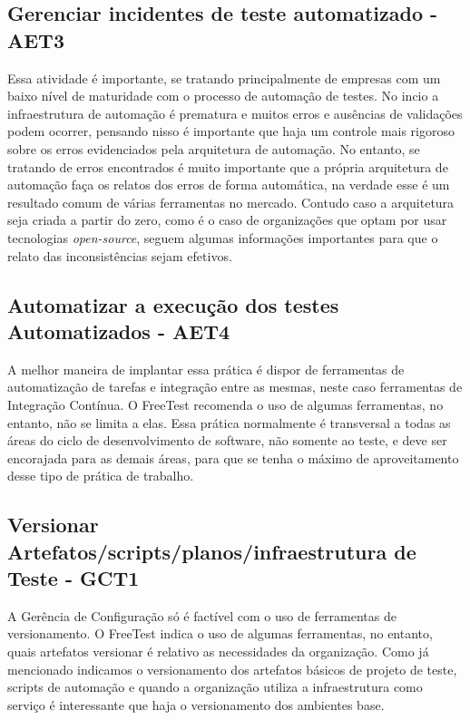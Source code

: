 \subsection{Gerenciar incidentes de teste automatizado - AET3}

Essa atividade é importante, se tratando principalmente de empresas com um baixo nível de maturidade com o processo de automação de testes. No incio a infraestrutura de automação é prematura e muitos erros e ausências de validações podem ocorrer, pensando nisso é importante que haja um controle mais rigoroso sobre os erros evidenciados pela arquitetura de automação.
No entanto, se tratando de erros encontrados é muito importante que a própria arquitetura de automação faça os relatos dos erros de forma automática, na verdade esse é um resultado comum de várias ferramentas no mercado. Contudo caso a arquitetura seja criada a partir do zero, como é o caso de organizações que optam por usar tecnologias \textit{open-source}, seguem algumas informações importantes para que o relato das inconsistências sejam efetivos.

\subsection{Automatizar a execução dos testes Automatizados - AET4}

A melhor maneira de implantar essa prática é dispor de ferramentas de automatização de tarefas e integração entre as mesmas, neste caso ferramentas de Integração Contínua. O FreeTest recomenda o uso de algumas ferramentas, no entanto, não se limita a elas. Essa prática normalmente é transversal a todas as áreas do ciclo de desenvolvimento de software, não somente ao teste, e deve ser encorajada para as demais áreas, para que se tenha o máximo de aproveitamento desse tipo de prática de trabalho.

\subsection{Versionar Artefatos/scripts/planos/infraestrutura de Teste - GCT1}

A Gerência de Configuração só é factível com o uso de ferramentas de versionamento. O FreeTest indica o uso de algumas ferramentas, no entanto, quais artefatos versionar é relativo as necessidades da organização. Como já mencionado indicamos o versionamento dos artefatos básicos de projeto de teste, scripts de automação e quando a organização utiliza a infraestrutura como serviço é interessante que haja o versionamento dos ambientes base.

